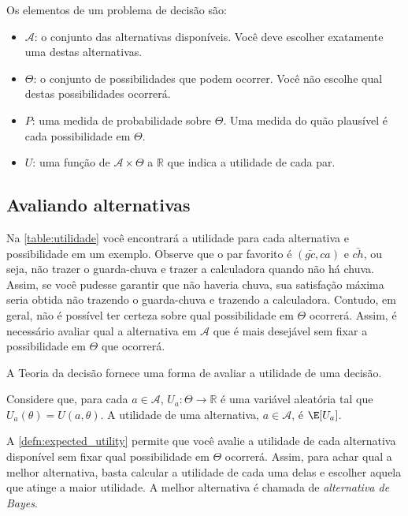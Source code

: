 \begin{definition}
 Os elementos de um problema de decisão são:
 \begin{itemize}
  \item $\mathcal{A}$: o conjunto das
  alternativas disponíveis.
  Você deve escolher exatamente uma destas alternativas.
  \item $\Theta$: o conjunto de possibilidades que
  podem ocorrer. Você não escolhe qual
  destas possibilidades ocorrerá.
  \item $P$: uma medida de probabilidade sobre $\Theta$.
  Uma medida do quão plausível é
  cada possibilidade em $\Theta$.
  \item $U$: uma função de $\mathcal{A} \times \Theta$ a
  $\mathbb{R}$ que indica a utilidade de cada par.
 \end{itemize}
\end{definition}

\subsection{Avaliando alternativas}

Na \cref{table:utilidade} você encontrará a
utilidade para cada alternativa e possibilidade em
um exemplo. Observe que o par favorito é
$(\bar{gc},ca)$ e $\bar{ch}$, ou seja,
não trazer o guarda-chuva e trazer a calculadora quando
não há chuva.
Assim, se você pudesse garantir que não haveria chuva,
sua satisfação máxima seria obtida não trazendo o guarda-chuva e trazendo a calculadora.
Contudo, em geral, não é possível ter certeza sobre qual possibilidade em $\Theta$ ocorrerá.
Assim, é necessário avaliar qual a alternativa em $\mathcal{A}$ que é mais desejável 
sem fixar a possibilidade em $\Theta$ que ocorrerá.

A Teoria da decisão fornece uma forma de avaliar a utilidade de uma decisão.

\begin{definition}
 \label{defn:expected_utility}
 Considere que, para cada $a \in \mathcal{A}$,
 $U_{a}:\Theta \rightarrow \mathbb{R}$ é uma variável aleatória tal que
 $U_{a}(\theta) = U(a,\theta)$. A utilidade de uma alternativa, $a \in \mathcal{A}$, é $\E[U_{a}]$.
\end{definition}

A \cref{defn:expected_utility} permite que
você avalie a utilidade de cada
alternativa disponível sem fixar qual
possibilidade em $\Theta$ ocorrerá.
Assim, para achar qual a melhor alternativa,
basta calcular a utilidade de cada uma delas e escolher
aquela que atinge a maior utilidade.
A melhor alternativa é chamada de \emph{alternativa de Bayes}.

